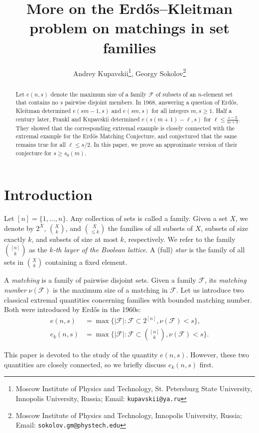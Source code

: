 \documentclass{article}
\title{More on the Erd\H os--Kleitman problem on matchings in set families}
\author{Andrey Kupavskii\footnote{Moscow Institute of Physics and Technology, St. Petersburg State University, Innopolis University, Russia; Email: {\tt kupavskii@ya.ru}}, Georgy Sokolov\footnote{Moscow Institute of Physics and Technology, Innopolis University, Russia; Email: {\tt sokolov.gm@phystech.edu}}}
\date{}
\begin{document}
\maketitle


\begin{abstract}
Let $e(n,s)$ denote the maximum size of a family $\mathcal{F}$ of subsets of an $n$-element set that contains no $s$ pairwise disjoint members. In 1968, answering a question of Erd\H{o}s, Kleitman determined $e(sm-1,s)$ and $e(sm,s)$ for all integers $m,s\ge 1$. Half a century later, Frankl and Kupavskii determined $e(s(m+1)-\ell, s)$ for $\ell \leq \frac{s-3}{m+3}$. They showed that the corresponding extremal example is closely connected with the extremal example for the Erd\H{o}s Matching Conjecture, and conjectured that  the same remains true for all $\ell \leq s/2$. In this paper, we prove an approximate version of their conjecture for $s\ge s_0(m)$.
\end{abstract}

\section{Introduction}

Let $[n] = \{1, \ldots, n\}$. Any collection of sets is called a family. Given a set $X$, we denote by $2^{X}$, ${X \choose k}$, and ${X \choose \leq k}$ the families of all subsets of $X$, subsets of size exactly $k$, and subsets of size at most $k$, respectively. We refer to the family ${[n] \choose k}$ as the {\it $k$-th layer of the Boolean lattice}. A (full) {\it star} is the family of all sets in ${X \choose k}$ containing a fixed element.

A {\it matching} is a family of pairwise disjoint sets. Given a family $\mathcal{F}$, its {\it matching number} $\nu(\mathcal{F})$ is the maximum size of a matching in $\mathcal{F}$.
Let us introduce two classical extremal quantities concerning families with bounded matching number. Both were introduced by Erd\H{o}s in the 1960s:
\begin{align*}
    e(n,s)&=\max\big\{|\mathcal{F}|: \mathcal{F}\subset 2^{[n]}, \nu(\mathcal{F})<s\big\},\\
    e_k(n,s)&=\max\Big\{|\mathcal{F}|: \mathcal{F}\subset {[n]\choose k}, \nu(\mathcal{F})<s\Big\}.
\end{align*}

This paper is devoted to the study of the quantity $e(n, s)$. However, these two quantities are closely connected, so we briefly discuss $e_k(n, s)$ first.
\end{document}
